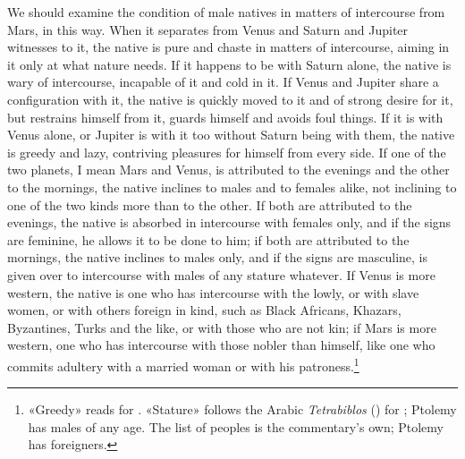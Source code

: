 \documentclass[11pt]{article}
\newcommand{\Fol}[1]{\marginpar{\footnotesize\color{gray}f.\,#1}}
\begin{document}
\par \Fol{70r}We should examine the condition of male natives in matters of intercourse from Mars, in this way. When it separates from Venus and Saturn and Jupiter witnesses to it, the native is pure and chaste in matters of intercourse, aiming in it only at what nature needs. If it happens to be with Saturn alone, the native is wary of intercourse, incapable of it and cold in it. If Venus and Jupiter share a configuration with it, the native is quickly moved to it and of strong desire for it, but restrains himself from it, guards himself and avoids foul things. If it is with Venus alone, or Jupiter is with it too without Saturn being with them, the native is greedy and lazy, contriving pleasures for himself from every side. If one of the two planets, I mean Mars and Venus, is attributed to the evenings and the other to the mornings, the native inclines to males and to females alike, not inclining to one of the two kinds more than to the other. If both are attributed to the evenings, the native is absorbed in intercourse with females only, and if the signs are feminine, he allows it to be done to him; if both are attributed to the mornings, the native inclines to males only, and if the signs are masculine, is given over to intercourse with males of any stature whatever. If Venus is more western, the native is one who has intercourse with the lowly, or with slave women, or with others foreign in kind, such as Black Africans, Khazars, Byzantines, Turks and the like, or with those who are not kin; if Mars is more western, one who has intercourse with those nobler than himself, like one who commits adultery with a married woman or with his patroness.\footnote{«Greedy» reads  for . «Stature» follows the Arabic \emph{Tetrabiblos} () for ; Ptolemy has males of any age. The list of peoples is the commentary's own; Ptolemy has foreigners.}\par
\end{document}
